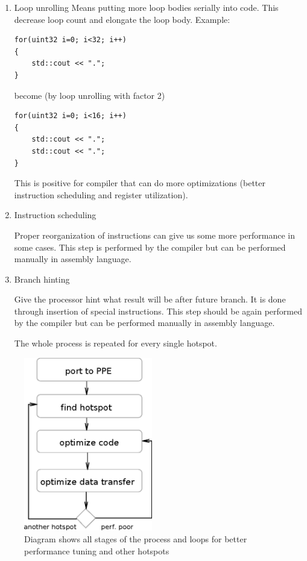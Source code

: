\begin{enumerate}
\item{Loop unrolling}
Means putting more loop bodies serially into code.
This decrease loop count and elongate the loop body.
Example:
\begin{verbatim}
for(uint32 i=0; i<32; i++)
{
    std::cout << ".";
}
\end{verbatim}
become (by loop unrolling with factor 2)
\begin{verbatim}
for(uint32 i=0; i<16; i++)
{
    std::cout << ".";
    std::cout << ".";
}
\end{verbatim}
This is positive for compiler that can do more optimizations (better instruction scheduling and register utilization).

\item{Instruction scheduling}
\par
Proper reorganization of instructions can give us some more performance in some cases.
This step is performed by the compiler but can be performed manually in assembly language.

\item{Branch hinting}
\par
Give the processor hint what result will be after future branch.
It is done through insertion of special instructions.
This step should be again performed by the compiler but can be performed manually in assembly language.

The whole process is repeated for every single hotspot.
\end{enumerate}

\begin{figure}
    \centering
    \includegraphics[width=0.5\textwidth]{data/portingCycle}
    \caption[Application for Cell B.E. porting process]{Diagram shows all stages of the process and loops for better performance tuning and other hotspots}
    \label{fg:appPorting}
\end{figure}

